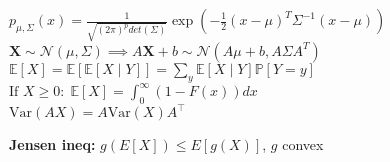 
\(p_{\mu, \Sigma}(x)=\frac{1}{\sqrt{(2\pi)^p det(\Sigma)}}\exp(-\frac{1}{2}(x-\mu)^T\Sigma^{-1}(x-\mu))\)\\
\(\mathbf{X} \sim \mathcal{N}(\mu, \Sigma) \implies A\mathbf{X} + b \sim \mathcal{N}(A\mu+b, A\Sigma A^T)\)\\
$\mathbb{E}[X] = \mathbb{E}[\mathbb{E}[X \; | \; Y]] = \sum_{y} \mathbb{E}[X \; | \; Y] \mathbb{P}[Y = y]$
$\text{If } X \geq 0: \; \mathbb{E}[X] = \int_{0}^{\infty} (1 - F(x))dx$\\
 $\text{Var}(AX) = A \text{Var}(X) A^\top$
 
\textbf{Jensen ineq: }$g(E[X]) \leq E[g(X)]$, $g$ convex

